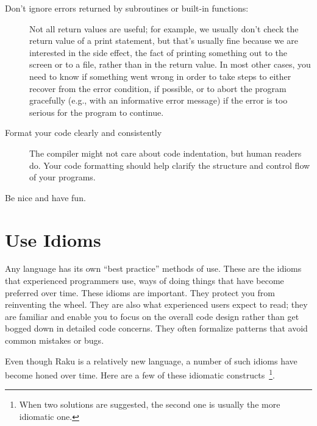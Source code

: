 \begin{description}
\item[Don't ignore errors returned by subroutines or built-in 
functions:] Not all return values are useful; for example, we 
usually don't check the return value of a print statement, but 
that's usually fine because we are interested in the side effect, 
the fact of printing something out to the screen or to a file, 
rather than in the return value. In most other cases, you need 
to know if something went wrong in order to take steps to either 
recover from the error condition, if possible, or to abort the 
program gracefully (e.g., with an informative error message) if 
the error is too serious for the program to continue.

\item[Format your code clearly and consistently] The compiler 
might not care about code indentation, but human readers do. 
Your code formatting should help clarify the structure and 
control flow of your programs.

\item[Be nice and have fun.]

\end{description}

\section{Use Idioms}

Any language has its own ``best practice'' methods of use. 
These are the idioms that experienced programmers use, ways of doing 
things that have become preferred over time. These idioms are important. 
They protect you from reinventing the wheel. They are also what 
experienced users expect to read; they are familiar 
and enable you to focus on the overall code design rather than
get bogged down in detailed code concerns. They often formalize 
patterns that avoid common mistakes or bugs.

Even though Raku is a relatively new language, a number of such 
idioms have become honed over time. Here are a few of these 
idiomatic constructs~\footnote{When two solutions are suggested, 
the second one is usually the more idiomatic one.}.


